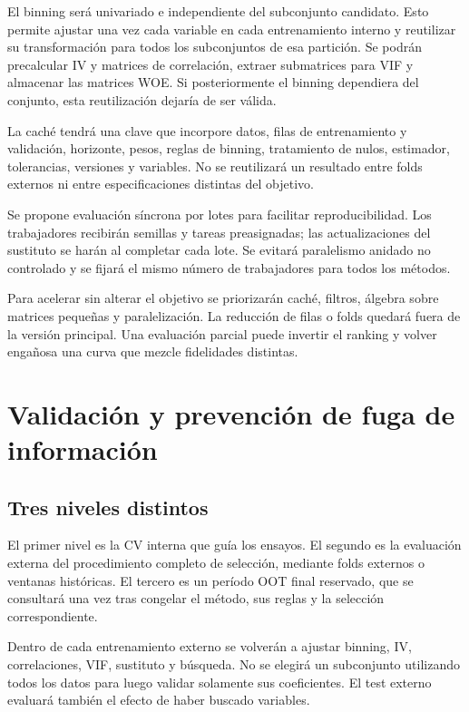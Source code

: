 \documentclass[11pt,letterpaper]{article}
\begin{document}
El binning será univariado e independiente del subconjunto candidato. Esto permite ajustar una vez cada variable en cada entrenamiento interno y reutilizar su transformación para todos los subconjuntos de esa partición. Se podrán precalcular IV y matrices de correlación, extraer submatrices para VIF y almacenar las matrices WOE. Si posteriormente el binning dependiera del conjunto, esta reutilización dejaría de ser válida.

La caché tendrá una clave que incorpore datos, filas de entrenamiento y validación, horizonte, pesos, reglas de binning, tratamiento de nulos, estimador, tolerancias, versiones y variables. No se reutilizará un resultado entre folds externos ni entre especificaciones distintas del objetivo.

Se propone evaluación síncrona por lotes para facilitar reproducibilidad. Los trabajadores recibirán semillas y tareas preasignadas; las actualizaciones del sustituto se harán al completar cada lote. Se evitará paralelismo anidado no controlado y se fijará el mismo número de trabajadores para todos los métodos.

Para acelerar sin alterar el objetivo se priorizarán caché, filtros, álgebra sobre matrices pequeñas y paralelización. La reducción de filas o folds quedará fuera de la versión principal. Una evaluación parcial puede invertir el ranking y volver engañosa una curva que mezcle fidelidades distintas.

\section{Validación y prevención de fuga de información}\label{sec:8}

\subsection{Tres niveles distintos}\label{sec:8.1}

El primer nivel es la CV interna que guía los ensayos. El segundo es la evaluación externa del procedimiento completo de selección, mediante folds externos o ventanas históricas. El tercero es un período OOT final reservado, que se consultará una vez tras congelar el método, sus reglas y la selección correspondiente.

Dentro de cada entrenamiento externo se volverán a ajustar binning, IV, correlaciones, VIF, sustituto y búsqueda. No se elegirá un subconjunto utilizando todos los datos para luego validar solamente sus coeficientes. El test externo evaluará también el efecto de haber buscado variables.
\end{document}
